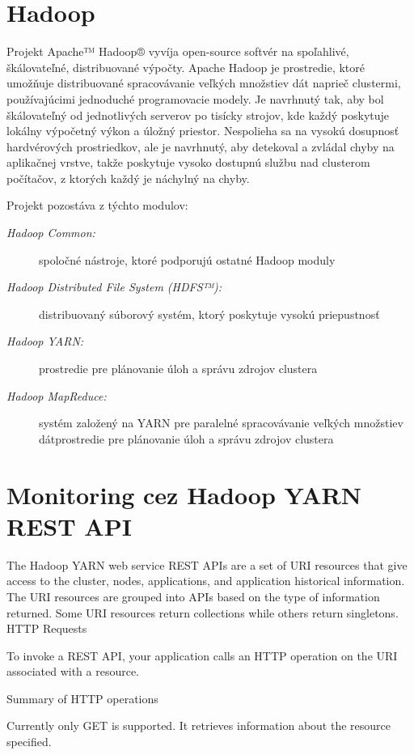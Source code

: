 \documentclass[11pt,final,oneside]{fithesis}
\begin{document}
\section{Hadoop}
Projekt Apache™ Hadoop® vyvíja open-source softvér na spoľahlivé, škálovateľné, distribuované výpočty. Apache Hadoop je prostredie, ktoré umožňuje distribuované spracovávanie veľkých množstiev dát
naprieč clustermi, používajúcimi jednoduché programovacie modely. Je navrhnutý tak, aby bol škálovateľný od jednotlivých serverov po tisícky strojov, kde každý poskytuje lokálny výpočetný výkon a úložný priestor.
Nespolieha sa na vysokú dosupnosť hardvérových prostriedkov, ale je navrhnutý, aby detekoval a zvládal chyby na aplikačnej vrstve, takže poskytuje vysoko dostupnú službu nad clusterom počítačov, z ktorých 
každý je náchylný na chyby.

Projekt pozostáva z týchto modulov:

\begin{description}
\item[\emph{Hadoop Common:}] spoločné nástroje, ktoré podporujú ostatné Hadoop moduly
\item[\emph{Hadoop Distributed File System (HDFS™):}] distribuovaný súborový systém, ktorý poskytuje vysokú priepustnosť
\item[\emph{Hadoop YARN:}] prostredie pre plánovanie úloh a správu zdrojov clustera
\item[\emph{Hadoop MapReduce:}] systém založený na YARN pre paralelné spracovávanie veľkých množstiev dátprostredie pre plánovanie úloh a správu zdrojov clustera
\end{description}

\section{Monitoring cez Hadoop YARN REST API}
The Hadoop YARN web service REST APIs are a set of URI resources that give access to the cluster, nodes, applications, and application historical information. The URI resources are grouped into APIs based on the type of information returned. Some URI resources return collections while others return singletons.
HTTP Requests

To invoke a REST API, your application calls an HTTP operation on the URI associated with a resource.

Summary of HTTP operations

Currently only GET is supported. It retrieves information about the resource specified.
\end{document}
